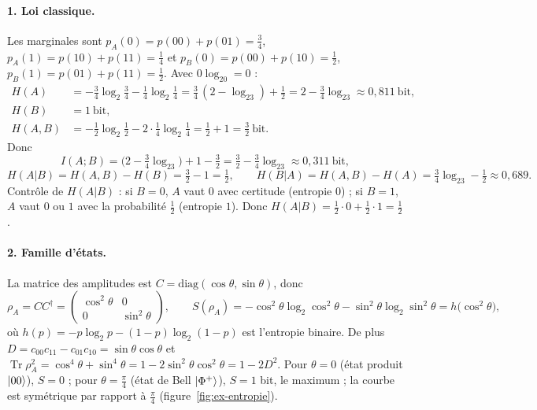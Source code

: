 \begin{correction}
\paragraph{1. Loi classique.} Les marginales sont
$p_A(0)=p(00)+p(01)=\frac34$, $p_A(1)=p(10)+p(11)=\frac14$ et
$p_B(0)=p(00)+p(10)=\frac12$, $p_B(1)=p(01)+p(11)=\frac12$. Avec $0\log_20=0$ :
\begin{align*}
  H(A)&=-\tfrac34\log_2\tfrac34-\tfrac14\log_2\tfrac14=\tfrac34\,(2-\log_23)+\tfrac12
       =2-\tfrac34\log_23\approx0{,}811\ \text{bit},\\
  H(B)&=1\ \text{bit},\\
  H(A,B)&=-\tfrac12\log_2\tfrac12-2\cdot\tfrac14\log_2\tfrac14=\tfrac12+1=\tfrac32\ \text{bit}.
\end{align*}
Donc
\[
  I(A;B)=\big(2-\tfrac34\log_23\big)+1-\tfrac32=\tfrac32-\tfrac34\log_23\approx0{,}311\ \text{bit},
\]
\[
  H(A|B)=H(A,B)-H(B)=\tfrac32-1=\tfrac12,\qquad
  H(B|A)=H(A,B)-H(A)=\tfrac34\log_23-\tfrac12\approx0{,}689 .
\]
Contrôle de $H(A|B)$ : si $B=0$, $A$ vaut $0$ avec certitude (entropie $0$) ; si $B=1$, $A$ vaut $0$ ou $1$
avec la probabilité $\frac12$ (entropie $1$). Donc $H(A|B)=\frac12\cdot0+\frac12\cdot1=\frac12$.

\paragraph{2. Famille d'états.} La matrice des amplitudes est $C=\mathrm{diag}(\cos\theta,\sin\theta)$, donc
\[
  \rho_A=CC^\dagger=\begin{pmatrix}\cos^2\theta&0\\0&\sin^2\theta\end{pmatrix},
  \qquad
  S(\rho_A)=-\cos^2\theta\log_2\cos^2\theta-\sin^2\theta\log_2\sin^2\theta=h\big(\cos^2\theta\big),
\]
où $h(p)=-p\log_2p-(1-p)\log_2(1-p)$ est l'entropie binaire. De plus
$D=c_{00}c_{11}-c_{01}c_{10}=\sin\theta\cos\theta$ et
$\operatorname{Tr}\rho_A^2=\cos^4\theta+\sin^4\theta=1-2\sin^2\theta\cos^2\theta=1-2D^2$.
Pour $\theta=0$ (état produit $|00\rangle$), $S=0$ ; pour $\theta=\frac\pi4$ (état de Bell $|\Phi^+\rangle$),
$S=1$ bit, le maximum ; la courbe est symétrique par rapport à $\frac\pi4$ (figure~\ref{fig:ex-entropie}).


\end{correction}

